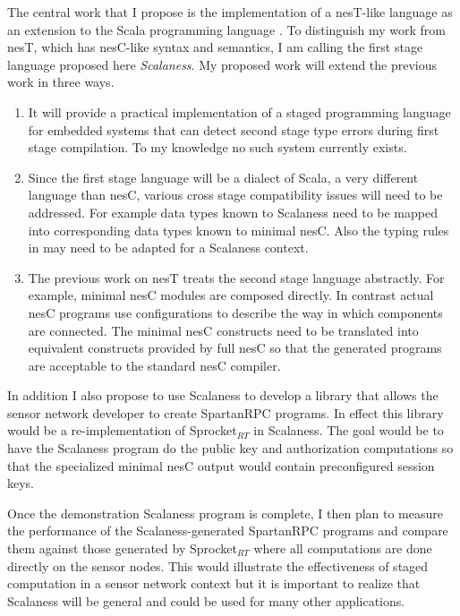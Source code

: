 \documentclass{article}
\begin{document}
The central work that I propose is the implementation of a nesT-like language as an extension to
the Scala programming language \cite{PiS2}. To distinguish my work from nesT, which has
nesC-like syntax and semantics, I am calling the first stage language proposed here
\textit{Scalaness}. My proposed work will extend the previous work in three ways.

\begin{enumerate}
\item It will provide a practical implementation of a staged programming language for embedded
  systems that can detect second stage type errors during first stage compilation. To my
  knowledge no such system currently exists.

\item Since the first stage language will be a dialect of Scala, a very different language than
  nesC, various cross stage compatibility issues will need to be addressed. For example data
  types known to Scalaness need to be mapped into corresponding data types known to minimal
  nesC. Also the typing rules in \cite{nesT} may need to be adapted for a Scalaness context.

\item The previous work on nesT treats the second stage language abstractly. For example,
  minimal nesC modules are composed directly. In contrast actual nesC programs use
  configurations to describe the way in which components are connected. The minimal nesC
  constructs need to be translated into equivalent constructs provided by full nesC so that the
  generated programs are acceptable to the standard nesC compiler.
\end{enumerate}

In addition I also propose to use Scalaness to develop a library that allows the sensor network
developer to create SpartanRPC programs. In effect this library would be a re-implementation of
Sprocket$_{RT}$ in Scalaness. The goal would be to have the Scalaness program do the public key
and authorization computations so that the specialized minimal nesC output would contain
preconfigured session keys.

Once the demonstration Scalaness program is complete, I then plan to measure the performance of
the Scalaness-generated SpartanRPC programs and compare them against those generated by
Sprocket$_{RT}$ where all computations are done directly on the sensor nodes. This would
illustrate the effectiveness of staged computation in a sensor network context but it is
important to realize that Scalaness will be general and could be used for many other
applications.
\end{document}
